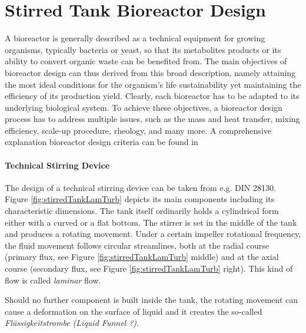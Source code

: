 \section{Stirred Tank Bioreactor Design}

A bioreactor is generally described as a technical equipment for growing organisms, typically bacteria or yeast, so that its metabolites products or its ability to convert organic waste can be benefited from. The main objectives of bioreactor design can thus derived from this broad description, namely attaining the most ideal conditions for the organism's life sustainability yet maintaining the efficiency of its production yield. Clearly, each bioreactor has to be adapted to its underlying biological system. To achieve these objectives, a bioreactor design process has to address multiple issues, such as the mass and heat transfer, mixing efficiency, scale-up procedure, rheology, and many more. A comprehensive explanation bioreactor design criteria can be found in \citet{mandenius2016challenges}


\paragraph{Technical Stirring Device}
The design of a technical stirring device can be taken from e.g. DIN 28130. Figure \ref{fig:stirredTankLamTurb} depicts its main components including its characteristic dimensions. The tank itself ordinarily holds a cylindrical form either with a curved or a flat bottom. The stirrer is set in the middle of the tank and produces a rotating movement. Under a certain impeller rotational frequency, the fluid movement follows circular streamlines, both at the radial course (primary flux, see Figure \ref{fig:stirredTankLamTurb} middle) and at the axial course (secondary flux, see Figure \ref{fig:stirredTankLamTurb} right). This kind of flow is called \textit{laminar} flow.

Should no further component is built inside the tank, the rotating movement can cause a deformation on the surface of liquid and it creates the so-called \textit{Fl\"ussigkeitstrombe (Liquid Funnel ?)}.

